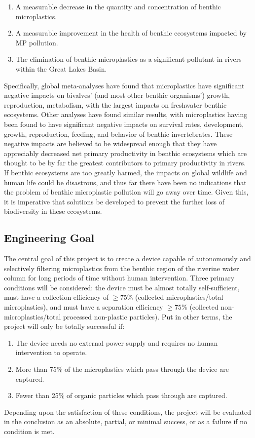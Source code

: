 \documentclass[fleqn,10pt]{SelfArx} %
\begin{document}
	\begin{enumerate}
		\item A measurable decrease in the quantity and concentration of \gls{benthic} microplastics.
		\item A measurable improvement in the health of \gls{benthic} ecosystems impacted by MP pollution. 
		\item The elimination of \gls{benthic} microplastics as a significant pollutant in rivers within the Great Lakes Basin.
		
	\end{enumerate}
	Specifically, global meta-analyses have found that microplastics have significant negative impacts on bivalves' (and most other benthic organisms') growth, reproduction, metabolism, with the largest impacts on freshwater benthic ecosystems\cite{Berlino__2021}. Other analyses have found similar results, with microplastics having been found to have significant negative impacts on survival rates, development, growth, reproduction, feeding, and behavior of benthic invertebrates\cite{MASON2022157362}. These negative impacts are believed to be widespread enough that they have appreciably decreased net primary productivity in benthic ecosystems which are thought to be by far the greatest contributors to primary productivity in rivers\cite{DAVIES200823}. If benthic ecosystems are too greatly harmed, the impacts on global wildlife and human life could be disastrous, and thus far there have been no indications that the problem of benthic microplastic pollution will go away over time. Given this, it is imperative that solutions be developed to prevent the further loss of biodiversity in these ecosystems. 
	
	\printglossaries
	
	
	
	
	\subsection{Engineering Goal}
	\label{sec:goals}
	The central goal of this project is to create a device capable of autonomously and selectively filtering microplastics from the \gls{benthic} region of the riverine water column for long periods of time without human intervention. Three primary conditions will be considered: the device must be almost totally self-sufficient, must have a collection efficiency of $\geq$75\% (collected microplastics/total microplastics), and must have a separation efficiency $\geq$75\% (collected non-microplastics/total processed non-plastic particles). Put in other terms, the project will only be totally successful if:
	\begin{enumerate}
		\item The device needs no external power supply and requires no human intervention to operate.
		\item More than 75\% of the microplastics which pass through the device are captured.
		\item Fewer than 25\% of organic particles which pass through are captured.	
	\end{enumerate}
	Depending upon the satisfaction of these conditions, the project will be evaluated in the conclusion as an absolute, partial, or minimal success, or as a failure if no condition is met.
\end{document}
